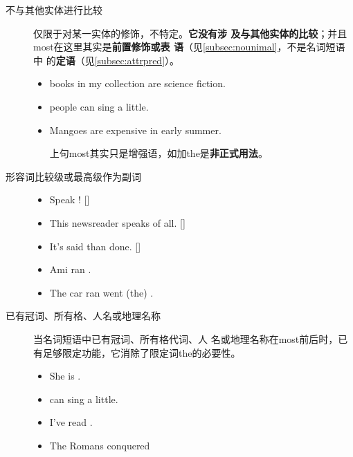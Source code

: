 \begin{description}
\item[不与其他实体进行比较] 仅限于对某一实体的修饰，不特定。\textbf{它没有涉
    及与其他实体的比较}；并且most在这里其实是\textbf{前置修饰或表
    语}（见\cref{subsec:nounimal}，不是名词短语中
  的\textbf{定语}（见\cref{subsec:attrpred}）。

  \begin{itemize}
  \item {} books in my collection are science fiction.

  \item {} people can sing a little.

  \item Mangoes are  expensive in early summer.

    上句most其实只是增强语，如加the是\textbf{非正式用法}。
  \end{itemize}

\item[形容词比较级或最高级作为副词]
  \begin{itemize}
  \item Speak ! []
  \item This newsreader speaks  of all. []
  \item It's  said than done. []
  \item Ami ran .
  \item The car ran went (the) .
  \end{itemize}

\item[已有冠词、所有格、人名或地理名称] 当名词短语中已有冠词、所有格代词、人
  名或地理名称在most前后时，已有足够限定功能，它消除了限定词the的必要性。
  \begin{itemize}
  \item She is .

  \item {} can sing a little.

  \item I've read .

  \item The Romans conquered 
  \end{itemize}

\end{description}


